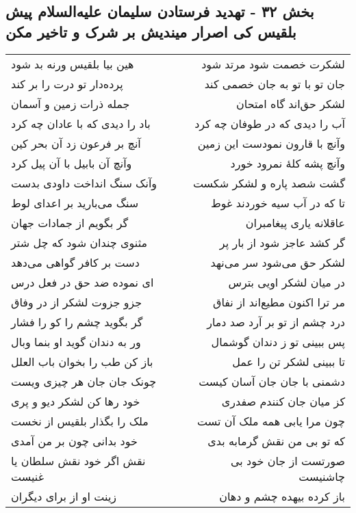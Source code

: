 \begin{center}
\section*{بخش ۳۲ - تهدید فرستادن سلیمان علیه‌السلام پیش بلقیس کی اصرار میندیش بر شرک و تاخیر مکن}
\label{sec:sh032}
\begin{longtable}{l p{0.5cm} r}
هین بیا بلقیس ورنه بد شود
&&
لشکرت خصمت شود مرتد شود
\\
پرده‌دار تو درت را بر کند
&&
جان تو با تو به جان خصمی کند
\\
جمله ذرات زمین و آسمان
&&
لشکر حق‌اند گاه امتحان
\\
باد را دیدی که با عادان چه کرد
&&
آب را دیدی که در طوفان چه کرد
\\
آنچ بر فرعون زد آن بحر کین
&&
وآنچ با قارون نمودست این زمین
\\
وآنچ آن بابیل با آن پیل کرد
&&
وآنچ پشه کلهٔ نمرود خورد
\\
وآنک سنگ انداخت داودی بدست
&&
گشت شصد پاره و لشکر شکست
\\
سنگ می‌بارید بر اعدای لوط
&&
تا که در آب سیه خوردند غوط
\\
گر بگویم از جمادات جهان
&&
عاقلانه یاری پیغامبران
\\
مثنوی چندان شود که چل شتر
&&
گر کشد عاجز شود از بار پر
\\
دست بر کافر گواهی می‌دهد
&&
لشکر حق می‌شود سر می‌نهد
\\
ای نموده ضد حق در فعل درس
&&
در میان لشکر اویی بترس
\\
جزو جزوت لشکر از در وفاق
&&
مر ترا اکنون مطیع‌اند از نفاق
\\
گر بگوید چشم را کو را فشار
&&
درد چشم از تو بر آرد صد دمار
\\
ور به دندان گوید او بنما وبال
&&
پس ببینی تو ز دندان گوشمال
\\
باز کن طب را بخوان باب العلل
&&
تا ببینی لشکر تن را عمل
\\
چونک جان جان هر چیزی ویست
&&
دشمنی با جان جان آسان کیست
\\
خود رها کن لشکر دیو و پری
&&
کز میان جان کنندم صفدری
\\
ملک را بگذار بلقیس از نخست
&&
چون مرا یابی همه ملک آن تست
\\
خود بدانی چون بر من آمدی
&&
که تو بی من نقش گرمابه بدی
\\
نقش اگر خود نقش سلطان یا غنیست
&&
صورتست از جان خود بی چاشنیست
\\
زینت او از برای دیگران
&&
باز کرده بیهده چشم و دهان
\\

\end{longtable}
\end{center}
